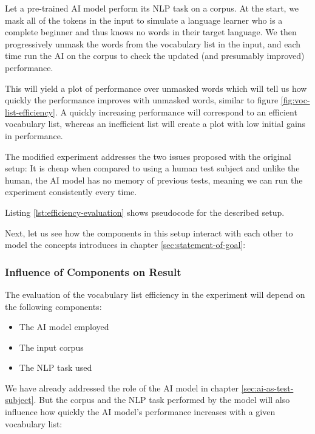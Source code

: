 Let a pre-trained AI model perform its NLP task on a corpus.
At the start, we mask all of the tokens in the input to simulate a language learner who is a complete beginner and thus knows no words in their target language.
We then progressively unmask the words from the vocabulary list in the input, and each time run the AI on the corpus to check the updated (and presumably improved) performance.

This will yield a plot of performance over unmasked words which will tell us how quickly the performance improves with unmasked words, similar to figure \ref{fig:voc-list-efficiency}.
A quickly increasing performance will correspond to an efficient vocabulary list, whereas an inefficient list will create a plot with low initial gains in performance.

The modified experiment addresses the two issues proposed with the original setup:
It is cheap when compared to using a human test subject and unlike the human, the AI model has no memory of previous tests, meaning we can run the experiment consistently every time.

Listing \ref{lst:efficiency-evaluation} shows pseudocode for the described setup.



Next, let us see how the components in this setup interact with each other to model the concepts introduces in chapter \ref{sec:statement-of-goal}:

\subsubsection{Influence of Components on Result}
The evaluation of the vocabulary list efficiency in the experiment will depend on the following components:

\begin{itemize}
	\item The AI model employed
	\item The input corpus
	\item The NLP task used
\end{itemize}

We have already addressed the role of the AI model in chapter \ref{sec:ai-as-test-subject}.
But the corpus and the NLP task performed by the model will also influence how quickly the AI model's performance increases with a given vocabulary list:

